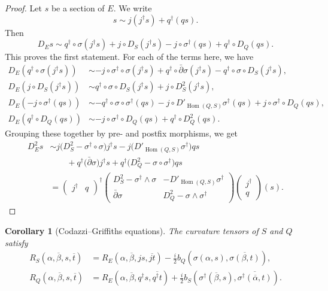 \documentclass[10pt,a4paper]{amsart}
\newtheorem{coro}[theo]{Corollary}
\theoremstyle{definition}
\def\ov#1{\overline{#1}}
\DeclareMathOperator{\Hom}{Hom}
\def\snd{\sigma}
\begin{document}
\begin{proof}
Let $s$ be a section of $E$. We write
\[
s \sim j (j^\dagger s) + q^\dagger( qs).
\]
Then
\[
D_E s
\sim q^\dagger \circ \snd (j^\dagger s)
+ j \circ D_S( j^\dagger s)
- j \circ \snd^\dagger (qs)
+ q^\dagger \circ D_Q (qs).
\]
This proves the first statement.
For each of the terms here, we have
\begin{align*}
D_E(q^\dagger \circ \snd (j^\dagger s))
&\sim -j \circ \snd^\dagger \circ \snd (j^\dagger s)
+ q^\dagger \circ \bar\partial \snd (j^\dagger s)
- q^\dagger \circ \snd \circ D_S(j^\dagger s),
\\
D_E(j \circ D_S( j^\dagger s))
&\sim q^\dagger \circ \snd \circ D_S(j^\dagger s)
+ j \circ D_S^2 (j^\dagger s),
\\
D_E(-j \circ \snd^\dagger (qs))
&\sim - q^\dagger \circ \snd \circ \snd^\dagger (qs)
- j \circ D'_{\Hom(Q,S)}\snd^\dagger (qs)
+ j \circ \snd^\dagger \circ D_Q(qs),
\\
D_E(q^\dagger \circ D_Q (qs))
&\sim -j \circ \snd^\dagger \circ D_Q(qs)
+ q^\dagger \circ D_Q^2 (qs).
\end{align*}
Grouping these together by pre- and postfix morphisms, we get
\begin{align*}
D_E^2 s
&\sim j \bigl( D_S^2 - \snd^\dagger \circ \snd \bigr) j^\dagger s
- j \bigl( D'_{\Hom(Q,S)} \snd^\dagger \bigr) qs
\\
&\qquad
+ q^\dagger \bigl( \bar\partial \snd \bigr) j^\dagger s
+ q^\dagger \bigl( D^2_Q - \snd \circ \snd^\dagger \bigr) qs
\\
&=
\begin{pmatrix}
j^\dagger & q
\end{pmatrix}^\dagger
\begin{pmatrix}
D^2_S - \snd^\dagger \wedge \snd & -D'_{\Hom(Q,S)} \snd^\dagger
\\
\bar\partial \snd & D^2_Q - \snd \wedge \snd^\dagger
\end{pmatrix}
\begin{pmatrix}
  j^\dagger \\ q
\end{pmatrix}(s).
\end{align*}
\end{proof}




\begin{coro}[Codazzi--Griffiths equations]
The curvature tensors of $S$ and $Q$ satisfy
\begin{align*}
R_S(\alpha, \ov\beta, s, \ov t)
&= R_E(\alpha, \ov\beta, js, \ov{jt})
- \tfrac i2 b_Q(\snd(\alpha, s), \ov{\snd(\beta, t)}),
\\
R_Q(\alpha, \ov\beta, s, \ov t)
&= R_E(\alpha, \ov\beta, q^\dagger s, \ov{q^\dagger t})
+ \tfrac i2 b_S(\snd^\dagger(\ov\beta, s), \ov{\snd^\dagger(\ov\alpha, t)}).
\end{align*}
\end{coro}
\end{document}
